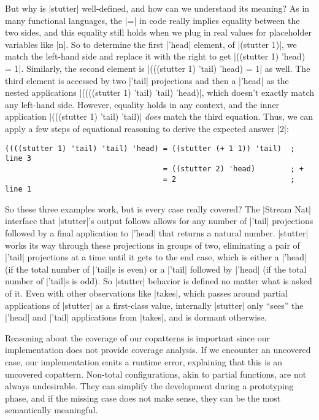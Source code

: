 But why is \scm|stutter| well-defined, and how can we understand its meaning?
As in many functional languages, the \scm|=| in code really implies equality between the two sides, and this equality still holds when we plug in real values for placeholder variables like \scm|n|.
So to determine the first \scm|'head| element, of \scm|(stutter 1)|, we match the left-hand side and replace it with the right to get \scm|((stutter 1) 'head) = 1|.
Similarly, the second element is \scm|(((stutter 1) 'tail) 'head) = 1| as well.
The third element is accessed by two \scm|'tail| projections and then a \scm|'head| as the nested applications \scm|((((stutter 1) 'tail) 'tail) 'head)|, which doesn't exactly match any left-hand side.
However, equality holds in any context, and the inner application \scm|(((stutter 1) 'tail) 'tail)| \emph{does} match the third equation.
Thus, we can apply a few steps of equational reasoning to derive the expected answer \scm|2|:
\begin{verbatim}
((((stutter 1) 'tail) 'tail) 'head) = ((stutter (+ 1 1)) 'tail)  ; line 3
                                    = ((stutter 2) 'head)        ; +
                                    = 2                          ; line 1
\end{verbatim}
So these three examples work, but is every case really covered?
The \scm|Stream Nat| interface that \scm|stutter|'s output follows allows for any number of \scm|'tail| projections followed by a final application to \scm|'head| that returns a natural number.
\scm|stutter| works its way through these projections in groups of two, eliminating a pair of \scm|'tail| projections at a time until it gets to the end case, which is either a \scm|'head| (if the total number of \scm|'tail|s is even) or a \scm|'tail| followed by \scm|'head| (if the total number of \scm|'tail|s is odd).
So \scm|stutter| behavior is defined no matter what is asked of it.
Even with other observations like \scm|takes|, which passes around partial applications of \scm|stutter| as a first-class value, internally \scm|stutter| only ``sees'' the \scm|'head| and \scm|'tail| applications from \scm|takes|, and is dormant otherwise.

Reasoning about the coverage of our copatterns is important since our implementation does not provide coverage analysis.
If we encounter an uncovered case, our implementation emits a runtime error, explaining that this is an uncovered copattern.
Non-total configurations, akin to partial functions, are not always undesirable. They can simplify the development during a prototyping phase, and if the missing case does not make sense, they can be the most semantically meaningful.

